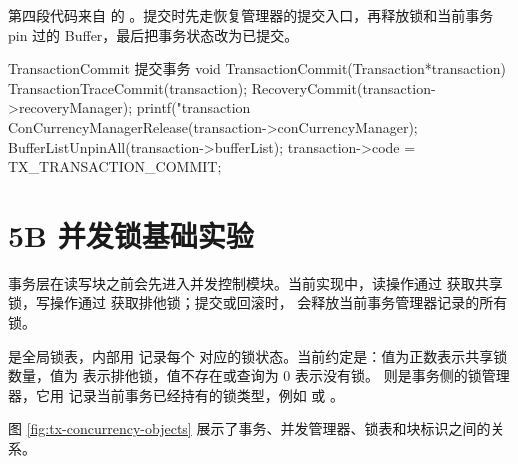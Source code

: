 第四段代码来自  的 。提交时先走恢复管理器的提交入口，再释放锁和当前事务 pin 过的 Buffer，最后把事务状态改为已提交。

\begin{dbcode}{TransactionCommit 提交事务}
void TransactionCommit(Transaction*transaction){
    TransactionTraceCommit(transaction);
    RecoveryCommit(transaction->recoveryManager);
    printf("transaction %
    ConCurrencyManagerRelease(transaction->conCurrencyManager);
    BufferListUnpinAll(transaction->bufferList);
    transaction->code = TX_TRANSACTION_COMMIT;
}
\end{dbcode}

\section{5B 并发锁基础实验}
\label{sec:tx-concurrency-basic}

事务层在读写块之前会先进入并发控制模块。当前实现中，读操作通过  获取共享锁，写操作通过  获取排他锁；提交或回滚时， 会释放当前事务管理器记录的所有锁。

 是全局锁表，内部用  记录每个  对应的锁状态。当前约定是：值为正数表示共享锁数量，值为  表示排他锁，值不存在或查询为 0 表示没有锁。 则是事务侧的锁管理器，它用  记录当前事务已经持有的锁类型，例如  或 。

图 \ref{fig:tx-concurrency-objects} 展示了事务、并发管理器、锁表和块标识之间的关系。

